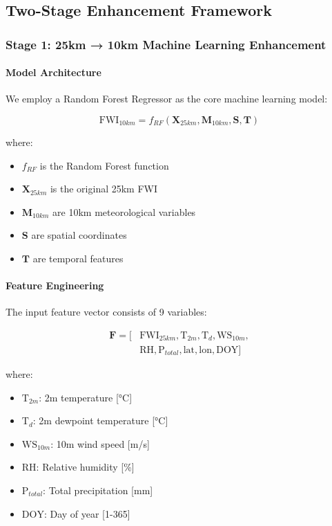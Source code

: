\documentclass[11pt,a4paper]{article}
\begin{document}
\subsection{Two-Stage Enhancement Framework}

\subsubsection{Stage 1: 25km → 10km Machine Learning Enhancement}

\paragraph{Model Architecture}
We employ a Random Forest Regressor as the core machine learning model:

\begin{equation}
    \text{FWI}_{10km} = f_{RF}(\mathbf{X}_{25km}, \mathbf{M}_{10km}, \mathbf{S}, \mathbf{T})
\end{equation}

where:
\begin{itemize}
    \item $f_{RF}$ is the Random Forest function
    \item $\mathbf{X}_{25km}$ is the original 25km FWI
    \item $\mathbf{M}_{10km}$ are 10km meteorological variables
    \item $\mathbf{S}$ are spatial coordinates
    \item $\mathbf{T}$ are temporal features
\end{itemize}

\paragraph{Feature Engineering}
The input feature vector consists of 9 variables:

\begin{align}
    \mathbf{F} = [&\text{FWI}_{25km}, \text{T}_{2m}, \text{T}_{d}, \text{WS}_{10m}, \nonumber \\
    &\text{RH}, \text{P}_{total}, \text{lat}, \text{lon}, \text{DOY}]
\end{align}

where:
\begin{itemize}
    \item $\text{T}_{2m}$: 2m temperature [°C]
    \item $\text{T}_{d}$: 2m dewpoint temperature [°C]
    \item $\text{WS}_{10m}$: 10m wind speed [m/s]
    \item $\text{RH}$: Relative humidity [\%]
    \item $\text{P}_{total}$: Total precipitation [mm]
    \item $\text{DOY}$: Day of year [1-365]
\end{itemize}
\end{document}
